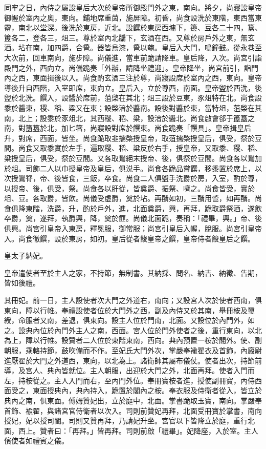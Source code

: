 \begin{pinyinscope}
 同牢之日，內侍之屬設皇后大次於皇帝所御殿門外之東，南向。將夕，尚寢設皇帝御幄於室內之奧，東向。鋪地席重茵，施屏障。初昏，尚食設洗於東階，東西當東霤，南北以堂深。後洗於東房，近北。設饌於東房西墉下，籩、豆各二十四，簋、簠各二，登各三，俎三。尊於室內北牖下，玄酒在西。又尊於房戶外之東，無玄酒。坫在南，加四爵，合巹。器皆烏漆，巹以匏。皇后入大門，鳴鐘鼓。從永巷至大次前，回車南向，施步障。尚儀進，當車前跪請降車。皇后降，入次。尚宮引詣殿門之外，西向立。尚儀跪奏「外辦，請降坐禮迎」。皇帝降坐，尚宮前引，詣門內之西，東面揖後以入。尚食酌玄酒三注於尊，尚寢設席於室內之西，東向。皇帝導後升自西階，入室即席，東向立。皇后入，立於尊西，南面。皇帝盥於西洗，後盥於北洗。饌入，設醬於席前，菹棨在其北；俎三設於豆東，豕俎特在北。尚食設黍於醬東，稷、稻、粱又在東；設棨湆於醬南。設後對醬於東，當特俎，菹棨在其南，北上；設黍於豕俎北，其西稷、稻、粱，設湆於醬北。尚食啟會郤于簠簋之南，對簠簋於北，加匕箸，尚寢設對席於饌東。尚食跪奏「饌具」。皇帝揖皇后升，對席，西面，皆坐。尚食跪取韭擩棨授皇帝，取菹擩棨授皇后，俱受，祭於豆間。尚食又取黍實於左手，遍取稷、稻、粱反於右手，授皇帝，又取黍、稷、稻、粱授皇后，俱受，祭於豆間。又各取鸑絕末授帝、後，俱祭於豆間。尚食各以鸑加於俎。司飾二人以巾授皇帝及皇后，俱涚手。尚食各跪品嘗饌，移黍置於席上，以次授鸑脊，帝、後皆食，三飯，卒食。尚食二人俱盥手洗爵於房，入室，酌於尊，以授帝、後，俱受，祭。尚食各以肝從，皆奠爵、振祭、嚌之。尚食皆受，實於俎、豆。各取爵，皆飲。尚儀受虛爵，奠於坫。再酳如初，三酳用巹，如再酳。尚食俱降東階，洗爵，升，酌於戶外，進，北面奠爵，興，再拜，跪取爵祭酒，遂飲卒爵，奠，遂拜，執爵興，降，奠於篚。尚儀北面跪，奏稱：「禮畢，興。」帝、後俱興。尚宮引皇帝入東房，釋冕服，御常服；尚宮引皇后入幄，脫服。尚宮引皇帝入。尚食徹饌，設於東房，如初。皇后從者餕皇帝之饌，皇帝侍者餕皇后之饌。



 皇太子納妃。



 皇帝遣使者至於主人之家，不持節，無制書。其納採、問名、納吉、納徵、告期，皆如後禮。



 其冊妃。前一日，主人設使者次大門之外道右，南向；又設宮人次於使者西南，俱東向，障以行帷。奉禮設使者位於大門外之西，副及內侍又於其南，舉冊桉及璽綬，命服者又南，差退，俱東向。設主人位於門南，北面。又設位於內門外，如之。設典內位於內門外主人之南，西面。宮人位於門外使者之後，重行東向，以北為上，障以行帷。設贊者二人位於東階東南，西向。典內預置一桉於閣外。使、副朝服，乘輅持節，鼓吹備而不作。至妃氏大門外次，掌嚴奉褕翟衣及首飾，內廄尉進厭翟於大門之外道西，東向，以北為上。諸衛帥其屬布儀仗。使者出次，持節前導，及宮人、典內皆就位。主人朝服，出迎於大門之外，北面再拜。使者入門而左，持桉從之。主人入門而右，至內門外位。奉冊寶桉者進，授使副冊寶，內侍西面受之，東面授典內，典內持入，跪置於閣內之桉。奉衣服及侍衛者從入，皆立於典內之南，俱東面。傅姆贊妃出，立於庭中，北面。掌書跪取玉寶，南向。掌嚴奉首飾、褕翟，與諸宮官侍衛者以次入。司則前贊妃再拜，北面受冊寶於掌書，南向授妃，妃以授司閨。司則又贊再拜，乃請妃升坐。宮官以下皆降立於庭，重行北面，西上。贊者曰：「再拜。」皆再拜。司則前啟「禮畢」。妃降座，入於室。主人儐使者如禮賓之儀。




\end{pinyinscope}
